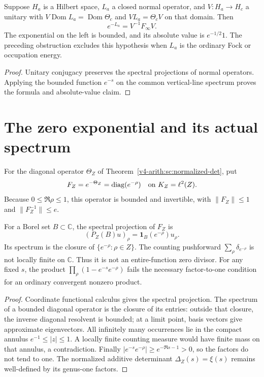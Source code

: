 \begin{theorem}
\label{v4-arith:w9-r2:thm:conjugacy}
Suppose $H_a$ is a Hilbert space, $L_a$ a closed normal operator,
and $V:H_a\to H_c$ a unitary with
$V\operatorname{Dom}L_a=\operatorname{Dom}\Theta_c$ and
$VL_a=\Theta_c V$ on that domain.
Then
\[
 e^{-L_a}=V^{-1}F_\infty V.
\]
The exponential on the left is bounded, and its absolute value is
$e^{-1/2}1$. The preceding obstruction excludes this hypothesis when
$L_a$ is the ordinary Fock or occupation energy.
\end{theorem}
\begin{proof}
Unitary conjugacy preserves the spectral projections of normal
operators. Applying the bounded function $e^{-s}$ on the common
vertical-line spectrum proves the formula and absolute-value claim.
\end{proof}

\section{The zero exponential and its actual spectrum}
\begin{definition}
For the diagonal operator $\Theta_Z$ of
Theorem~\ref{v4-arith:sc:normalized-det}, put
\[
 F_Z=e^{-\Theta_Z}=\operatorname{diag}(e^{-\rho})
 \quad\hbox{on }K_Z=\ell^2(Z).
\]
Because $0\le\Re\rho\le1$, this operator is bounded and invertible,
with $\|F_Z\|\le1$ and $\|F_Z^{-1}\|\le e$.
\end{definition}

\begin{proposition}
\label{v4-arith:w9-r2:thm:spectral-identification}
For a Borel set $B\subset\mathbb C$, the spectral projection of
$F_Z$ is
\[
 (P_Z(B)u)_\rho=\mathbf1_B(e^{-\rho})u_\rho.
\]
Its spectrum is the closure of $\{e^{-\rho}:\rho\in Z\}$.
The counting pushforward $\sum_\rho\delta_{e^{-\rho}}$ is not
locally finite on $\mathbb C$. Thus it is not an entire-function
zero divisor.
For any fixed $s$, the product
$\prod_\rho(1-e^{-s}e^{-\rho})$ fails the necessary factor-to-one
condition for an ordinary convergent nonzero product.
\end{proposition}
\begin{proof}
Coordinate functional calculus gives the spectral projection.
The spectrum of a bounded diagonal operator is the closure of its
entries: outside that closure, the inverse diagonal resolvent is
bounded; at a limit point, basis vectors give approximate eigenvectors.
All infinitely many occurrences lie in the compact annulus
$e^{-1}\le|z|\le1$. A locally finite counting measure would have
finite mass on that annulus, a contradiction.
Finally $|e^{-s}e^{-\rho}|\ge e^{-\Re s-1}>0$, so the factors do
not tend to one. The normalized additive determinant
$\Delta_Z(s)=\xi(s)$ remains well-defined by its genus-one factors.
\end{proof}

